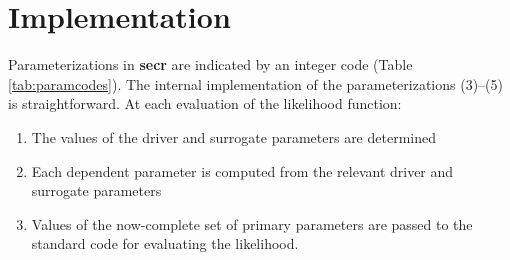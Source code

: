 \documentclass[
]{book}
\providecommand{\tightlist}{%
  \setlength{\itemsep}{0pt}\setlength{\parskip}{0pt}}
\begin{document}
\section{Implementation}\label{implementation}

Parameterizations in \textbf{secr} are indicated by an integer code (Table \ref{tab:paramcodes}). The internal implementation of the parameterizations (3)--(5) is straightforward. At each evaluation of the likelihood function:

\begin{enumerate}
\def\labelenumi{\arabic{enumi}.}
\tightlist
\item
  The values of the driver and surrogate parameters are determined
\item
  Each dependent parameter is computed from the relevant driver and surrogate parameters
\item
  Values of the now-complete set of primary parameters are passed to the standard
  code for evaluating the likelihood.
\end{enumerate}
\end{document}

